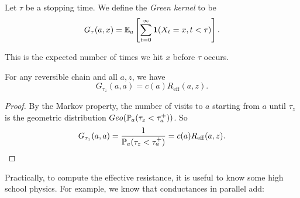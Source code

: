 \documentclass[a4paper]{article}
\begin{document}
\begin{defi}
  Let $\tau$ be a stopping time. We define the \emph{Green kernel} to be
  \[
    G_\tau(a, x) = \E_a \left[ \sum_{t = 0}^\infty \mathbf{1}(X_t = x, t < \tau)\right].
  \]
\end{defi}
This is the expected number of times we hit $x$ before $\tau$ occurs.
\begin{cor}
  For any reversible chain and all $a, z$, we have
  \[
    G_{\tau_z}(a, a) = c(a) R_{\mathrm{eff}}(a, z).
  \]
\end{cor}

\begin{proof}
  By the Markov property, the number of visits to $a$ starting from $a$ until $\tau_z$ is the geometric distribution $Geo(\P_a(\tau_z < \tau_a^+))$. So
  \[
    G_{\tau_z}(a, a) = \frac{1}{\P_a(\tau_z < \tau_a^+)} = c(a) R_{\mathrm{eff}}(a, z).\qedhere
  \]
\end{proof}

Practically, to compute the effective resistance, it is useful to know some high school physics. For example, we know that conductances in parallel add:
\begin{center}
\end{center}
\end{document}
